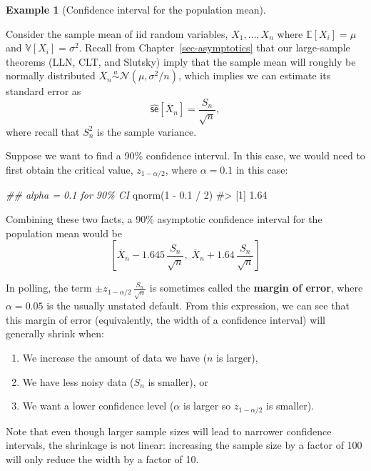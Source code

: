 \documentclass[
  13pt,
  letterpaper,
  DIV=11,
  numbers=noendperiod]{scrreprt}
\newenvironment{Shaded}{\begin{snugshade}}{\end{snugshade}}
\newcommand{\CommentTok}[1]{\textcolor[rgb]{0.37,0.37,0.37}{#1}}
\newcommand{\DecValTok}[1]{\textcolor[rgb]{0.68,0.00,0.00}{#1}}
\newcommand{\DocumentationTok}[1]{\textcolor[rgb]{0.37,0.37,0.37}{\textit{#1}}}
\newcommand{\FloatTok}[1]{\textcolor[rgb]{0.68,0.00,0.00}{#1}}
\newcommand{\FunctionTok}[1]{\textcolor[rgb]{0.28,0.35,0.67}{#1}}
\newcommand{\NormalTok}[1]{\textcolor[rgb]{0.00,0.23,0.31}{#1}}
\newcommand{\SpecialCharTok}[1]{\textcolor[rgb]{0.37,0.37,0.37}{#1}}
\providecommand{\tightlist}{%
  \setlength{\itemsep}{0pt}\setlength{\parskip}{0pt}}
\newcommand{\E}{\mathbb{E}}
\newcommand{\V}{\mathbb{V}}
\newcommand{\N}{\mathcal{N}}
\newcommand{\se}{\textsf{se}}
\newcommand{\Xbar}{\overline{X}}
\theoremstyle{plain}
\theoremstyle{plain}
\theoremstyle{definition}
\theoremstyle{definition}
\newtheorem{example}{Example}[chapter]
\theoremstyle{remark}
\begin{document}
\begin{example}[Confidence interval for the population
mean]\protect\hypertarget{exm-sample-mean-ci}{}\label{exm-sample-mean-ci}

Consider the sample mean of iid random variables, \(X_1, \ldots, X_n\)
where \(\E[X_i] = \mu\) and \(\V[X_i] = \sigma^2\). Recall from
Chapter~\ref{sec-asymptotics} that our large-sample theorems (LLN, CLT,
and Slutsky) imply that the sample mean will roughly be normally
distributed \(\Xbar_n \overset{a}{\sim} \N(\mu, \sigma^2/n)\), which
implies we can estimate its standard error as \[
\widehat{\se}[\Xbar_n] = \frac{S_n}{\sqrt{n}},
\] where recall that \(S^2_n\) is the sample variance.

Suppose we want to find a 90\% confidence interval. In this case, we
would need to first obtain the critical value, \(z_{1-\alpha/2}\), where
\(\alpha = 0.1\) in this case:

\begin{Shaded}
\begin{Highlighting}[]
\DocumentationTok{\#\# alpha = 0.1 for 90\% CI}
\FunctionTok{qnorm}\NormalTok{(}\DecValTok{1} \SpecialCharTok{{-}} \FloatTok{0.1} \SpecialCharTok{/} \DecValTok{2}\NormalTok{)}
\CommentTok{\#\textgreater{} [1] 1.64}
\end{Highlighting}
\end{Shaded}

Combining these two facts, a 90\% asymptotic confidence interval for the
population mean would be \[
\left[\Xbar_{n} - 1.645\, \frac{S_n}{\sqrt{n}},\; \Xbar_{n} + 1.64 \,\frac{S_n}{\sqrt{n}}\right]
\]

In polling, the term \(\pm z_{1-\alpha/2} \, \frac{S_n}{\sqrt{n}}\) is
sometimes called the \textbf{margin of error}, where \(\alpha = 0.05\)
is the usually unstated default. From this expression, we can see that
this margin of error (equivalently, the width of a confidence interval)
will generally shrink when:

\begin{enumerate}
\def\labelenumi{\arabic{enumi}.}
\tightlist
\item
  We increase the amount of data we have (\(n\) is larger),
\item
  We have less noisy data (\(S_n\) is smaller), or
\item
  We want a lower confidence level (\(\alpha\) is larger so
  \(z_{1-\alpha/2}\) is smaller).
\end{enumerate}

Note that even though larger sample sizes will lead to narrower
confidence intervals, the shrinkage is not linear: increasing the sample
size by a factor of 100 will only reduce the width by a factor of 10.

\end{example}
\end{document}
